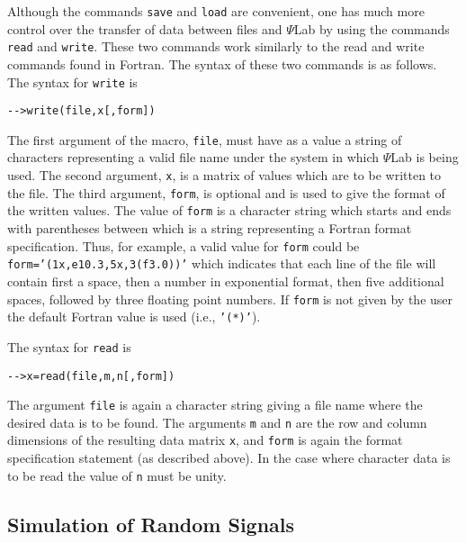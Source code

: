 	Although the commands {\tt save} and {\tt load} are
convenient, one has much more control over the transfer of
data between files and $\Psi$Lab by using the commands {\tt read}
and {\tt write}.  These two commands work similarly to the
read and write commands found in Fortran.  The syntax of these
two commands is as follows.  The syntax for {\tt write} is
\begin{verbatim}
-->write(file,x[,form])
\end{verbatim}
The first argument of the macro, {\tt file}, must have
as a value a string of characters representing a valid file name
under the system in which $\Psi$Lab is being used.  The second argument,
{\tt x}, is a matrix of values which are to be written to the file.
The third argument, {\tt form}, is optional and is used to give
the format of the written values.  The value of {\tt form} is a 
character string which starts and ends with parentheses between which
is a string representing a Fortran format specification.  Thus,
for example, a valid value for {\tt form} could be 
{\tt form='(1x,e10.3,5x,3(f3.0))'} which indicates that each
line of the file will contain first a space, then a number in exponential
format, then five additional spaces, followed by three floating point 
numbers.  If {\tt form} is not given by the user the default Fortran
value is used (i.e., {\tt '(*)'}).

	The syntax for {\tt read} is
\begin{verbatim}
-->x=read(file,m,n[,form])
\end{verbatim}
The argument {\tt file} is again a character string giving a file name where
the desired data is to be found.  The arguments {\tt m} and {\tt n}
are the row and column dimensions of the resulting data matrix {\tt x},
and {\tt form} is again the format specification statement (as described
above).  In the case where character data is to be read the value
of {\tt n} must be unity.

\subsection{Simulation of Random Signals}

